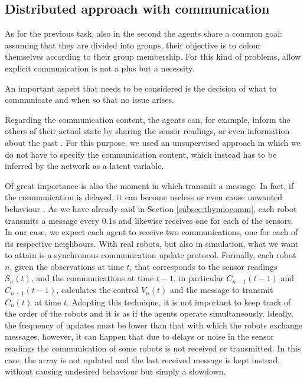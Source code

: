 \subsection{Distributed approach with communication}
\label{subsec:comm}

As for the previous task, also in the second the agents share a common goal: 
assuming that they are divided into groups, their objective is to colour themselves 
according to their group membership. 
For this kind of problems, allow explicit communication is not a plus but a 
necessity.

An important aspect that needs to be considered is the decision of what to 
communicate and when so that no issue arises.

Regarding the communication content, the agents can, for example, inform the 
others of their actual state by sharing the sensor readings, or even information 
about the past \cite[][]{guestrin2002coordinated, panait2005cooperative}.
For this purpose, we used an unsupervised approach in which we do not have to 
specify the communication content, which instead has to be inferred by the 
network as a latent variable.

Of great importance is also the moment in which transmit a message. In fact, if the 
communication is delayed, it can become useless or even cause unwanted 
behaviour \cite[][]{stone2000multiagent}.
As we have already said in Section \ref{subsec:thymiocomm}, each robot transmits 
a message every $0.1$\gls{s} and likewise receives one for each of the sensors. In 
our case, we expect each agent to receive two communications, one for each of its 
respective neighbours. With real robots, but also in simulation, what we want to 
attain is a synchronous communication update protocol. Formally, each robot 
$n$, given the observations at time $t$, that corresponds to the sensor readings 
$S_n(t)$, and the communications at time $t-1$, in particular $C_{n-1}(t-1)$ 
and $C_{n+1}(t-1)$, calculates the control $V_n(t)$ and the message to 
transmit $C_n(t)$ at time $t$. 
Adopting this technique, it is not important to keep track of the order of the 
robots and it is as if the agents operate simultaneously. 
Ideally, the frequency of updates must be lower than that with which the 
robots exchange messages, however, it can happen that due to delays or 
noise in the sensor readings the communication of some robots is not 
received or transmitted. In this case, the array is not updated and the last 
received message is kept instead, without causing undesired behaviour but simply 
a slowdown.

